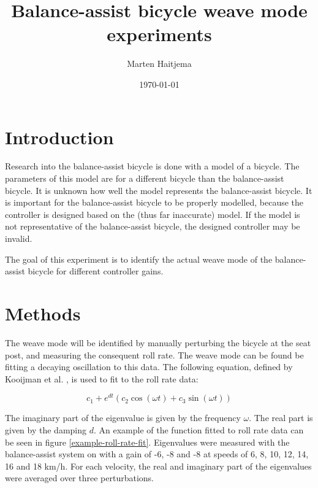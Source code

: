 \documentclass[12pt]{article}
\title{Balance-assist bicycle weave mode experiments}
\author{Marten Haitjema}
\date{\today}
\begin{document}
\maketitle

\section{Introduction}
Research into the balance-assist bicycle is done with a model of a bicycle. The parameters of this model are for a different bicycle than the balance-assist bicycle. It is unknown how well the model represents the balance-assist bicycle. It is important for the balance-assist bicycle to be properly modelled, because the controller is designed based on the (thus far inaccurate) model. If the model is not representative of the balance-assist bicycle, the designed controller may be invalid. 

The goal of this experiment is to identify the actual weave mode of the balance-assist bicycle for different controller gains. 

\section{Methods}
The weave mode will be identified by manually perturbing the bicycle at the seat post, and measuring the consequent roll rate. The weave mode can be found be fitting a decaying oscillation to this data. The following equation, defined by Kooijman et al. \cite{Kooijman2008}, is used to fit to the roll rate data:

\begin{equation}
    c_1 + e^{dt} (c_2\cos(\omega t) + c_3\sin(\omega t))
    \label{kooijman-func}
\end{equation}

The imaginary part of the eigenvalue is given by the frequency $\omega$. The real part is given by the damping $d$. An example of the function fitted to roll rate data can be seen in figure \ref{example-roll-rate-fit}. Eigenvalues were measured with the balance-assist system on with a gain of -6, -8 and -8 at speeds of 6, 8, 10, 12, 14, 16 and 18 km/h. For each velocity, the real and imaginary part of the eigenvalues were averaged over three perturbations.
\end{document}
